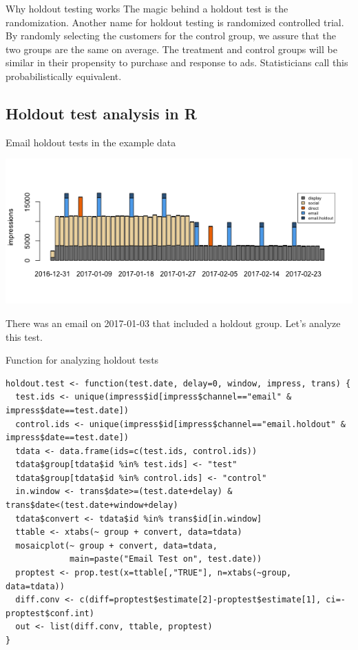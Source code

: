 \documentclass[10pt, aspectratio=169]{beamer}
\begin{document}
\begin{frame}{Why holdout testing works}
The magic behind a holdout test is the randomization. Another name for holdout testing is \alert{randomized controlled trial}. \\
\bigskip \pause
By randomly selecting the customers for the control group, we assure that the two groups are the same on average. The treatment and control groups will be similar in their propensity to purchase and response to ads. Statisticians call this \alert{probabilistically equivalent}. 
\end{frame}

\subsection{Holdout test analysis in R}

\begin{frame}{Email holdout tests in the example data}
\begin{center}
\includegraphics[width=.85\textwidth]{images/cadence.png}
\end{center}
\alert{There was an email on 2017-01-03 that included a holdout group.  Let's analyze this test.}
\end{frame}

\begin{frame}[fragile]{Function for analyzing holdout tests}
\begin{lstlisting}[basicstyle=\tiny\ttfamily]
holdout.test <- function(test.date, delay=0, window, impress, trans) {
  test.ids <- unique(impress$id[impress$channel=="email" & impress$date==test.date])
  control.ids <- unique(impress$id[impress$channel=="email.holdout" & impress$date==test.date])
  tdata <- data.frame(ids=c(test.ids, control.ids))
  tdata$group[tdata$id %in% test.ids] <- "test"
  tdata$group[tdata$id %in% control.ids] <- "control"
  in.window <- trans$date>=(test.date+delay) & trans$date<(test.date+window+delay)
  tdata$convert <- tdata$id %in% trans$id[in.window]
  ttable <- xtabs(~ group + convert, data=tdata)
  mosaicplot(~ group + convert, data=tdata, 
             main=paste("Email Test on", test.date))
  proptest <- prop.test(x=ttable[,"TRUE"], n=xtabs(~group, data=tdata))
  diff.conv <- c(diff=proptest$estimate[2]-proptest$estimate[1], ci=-proptest$conf.int)
  out <- list(diff.conv, ttable, proptest)
}
\end{lstlisting}
\end{frame}
\end{document}
